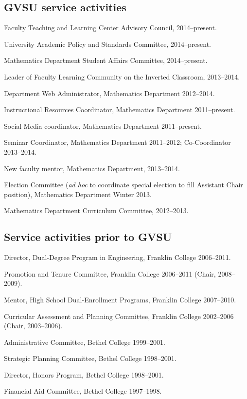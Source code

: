 \documentclass[letterpaper]{article}
\renewenvironment{itemize}{
  \begin{list}{}{
    \setlength{\leftmargin}{1.5em}
	\setlength{\itemsep}{0in}
  }
}{
  \end{list}
}
\begin{document}
\subsection*{GVSU service activities}
\begin{itemize}
	\item Faculty Teaching and Learning Center Advisory Council, 2014--present. 
	\item University Academic Policy and Standards Committee, 2014--present. 
	\item Mathematics Department Student Affairs Committee, 2014--present. 
	\item Leader of Faculty Learning Community on the Inverted Classroom, 2013--2014. 
	\item Department Web Administrator, Mathematics Department 2012--2014.  
	\item Instructional Resources Coordinator, Mathematics Department 2011--present. 
	\item Social Media coordinator, Mathematics Department 2011--present.
	\item Seminar Coordinator, Mathematics Department 2011--2012; Co-Coordinator 2013--2014. 
	\item New faculty mentor, Mathematics Department, 2013--2014. 
	\item Election Committee (\emph{ad hoc} to coordinate special election to fill Assistant Chair position), Mathematics Department Winter 2013. 
	\item Mathematics Department Curriculum Committee, 2012--2013. 
\end{itemize}

\subsection*{Service activities prior to GVSU}
\begin{itemize}
	\item Director, Dual-Degree Program in Engineering, Franklin College 2006--2011. 
	\item Promotion and Tenure Committee, Franklin College 2006--2011 (Chair, 2008--2009). 
	\item Mentor, High School Dual-Enrollment Programs, Franklin College 2007--2010. 
	\item Curricular Assessment and Planning Committee, Franklin College 2002--2006 (Chair, 2003--2006). 
	\item Administrative Committee, Bethel College 1999--2001. 
	\item Strategic Planning Committee, Bethel College 1998--2001. 
	\item Director, Honors Program, Bethel College 1998--2001. 
	\item Financial Aid Committee, Bethel College 1997--1998. 
\end{itemize}
\end{document}
